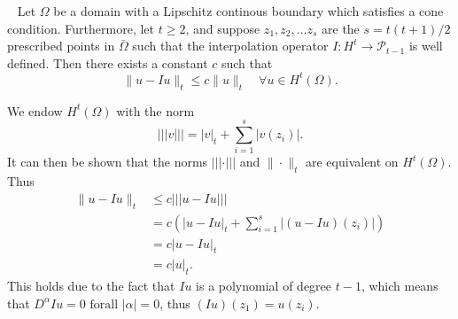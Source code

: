 
\begin{lem}{\quad~\label{lem:6.2}}
Let $\Omega$ be a domain with a Lipschitz continous boundary which satisfies a cone condition. Furthermore, let $t\geq 2$, and suppose $z_1,z_2,\ldots z_s$ are the
$s = t(t+1)/2$ prescribed points in $\bar{\Omega}$ such that the interpolation operator $I:H^t \rightarrow \mathcal{P}_{t-1}$ is well defined.
Then there exists a constant $c$ such that
\begin{equation}
    \|u-Iu\|_t\leq c\|u\|_t\quad \forall u\in H^t(\Omega).
    \label{eq:lem_6.2}
\end{equation}
\end{lem}

\begin{bev}
    We endow $H^t(\Omega)$ with the norm 
    \begin{equation*}
        |||v||| = |v|_t + \sum_{i=1}^s |v(z_i)|.
    \end{equation*}
It can then be shown that the norms $|||\cdot|||$ and $\|\cdot\|_t$ are equivalent on $H^t(\Omega)$. Thus
\begin{align*}
    \|u-Iu\|_t&\leq c|||u-Iu|||\\
    &= c(|u-Iu|_t + \sum_{i=1}^s|(u-Iu)(z_i)|)\\
    &= c|u-Iu|_t \\
    &= c|u|_t.
\end{align*}
This holds due to the fact that $Iu$ is a polynomial of degree $t-1$, which means that $D^{\alpha} Iu = 0 \text{ forall } |\alpha|=0$, thus $(Iu)(z_1)=u(z_i)$.


\end{bev}
